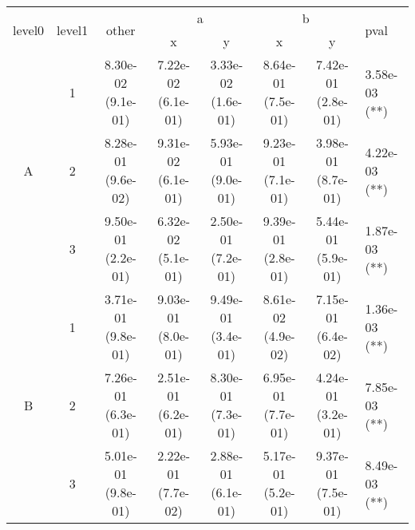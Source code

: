 \begin{tabular}{cccccccl}
\toprule
\multirow{2}{*}{level0} & \multirow{2}{*}{level1}& \multirow{2}{*}{other}&\multicolumn{2}{c}{a}&\multicolumn{2}{c}{b}& \multirow{2}{*}{pval}\tabularnewline
\cmidrule(lr){4-5}
\cmidrule(lr){6-7}
&&&x&y&x&y\tabularnewline
\midrule
\multirow{3}{*}{A}&1& 8.30e-02 (9.1e-01)& 7.22e-02 (6.1e-01)& 3.33e-02 (1.6e-01)& 8.64e-01 (7.5e-01)& 7.42e-01 (2.8e-01)& 3.58e-03 (**)\tabularnewline
&2& 8.28e-01 (9.6e-02)& 9.31e-02 (6.1e-01)& 5.93e-01 (9.0e-01)& 9.23e-01 (7.1e-01)& 3.98e-01 (8.7e-01)& 4.22e-03 (**)\tabularnewline
&3& 9.50e-01 (2.2e-01)& 6.32e-02 (5.1e-01)& 2.50e-01 (7.2e-01)& 9.39e-01 (2.8e-01)& 5.44e-01 (5.9e-01)& 1.87e-03 (**)\tabularnewline
\midrule
\multirow{3}{*}{B}&1& 3.71e-01 (9.8e-01)& 9.03e-01 (8.0e-01)& 9.49e-01 (3.4e-01)& 8.61e-02 (4.9e-02)& 7.15e-01 (6.4e-02)& 1.36e-03 (**)\tabularnewline
&2& 7.26e-01 (6.3e-01)& 2.51e-01 (6.2e-01)& 8.30e-01 (7.3e-01)& 6.95e-01 (7.7e-01)& 4.24e-01 (3.2e-01)& 7.85e-03 (**)\tabularnewline
&3& 5.01e-01 (9.8e-01)& 2.22e-01 (7.7e-02)& 2.88e-01 (6.1e-01)& 5.17e-01 (5.2e-01)& 9.37e-01 (7.5e-01)& 8.49e-03 (**)\tabularnewline
\bottomrule
\end{tabular}
